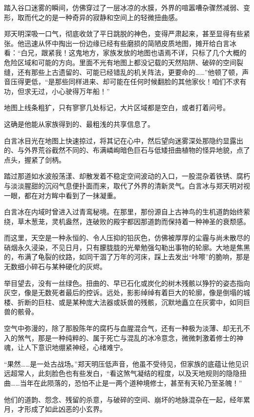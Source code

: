 踏入谷口迷雾的瞬间，仿佛穿过了一层冰凉的水膜，外界的喧嚣嘈杂骤然减弱、变形，取而代之的是一种奇异的寂静和空间上的轻微扭曲感。

郑天明深吸一口气，彻底收敛了平日跳脱的神色，变得严肃起来，甚至显得有些紧张。他迅速从怀中掏出一份边缘已经有些磨损的简陋皮质地图，摊开给白言冰看：“白兄，跟紧我！这鬼地方，家族发放的地图也语焉不详，只标了几个大概的危险区域和可能的方向。里面不光有地图上都没记载的天然陷阱、破碎的空间裂缝，还有那些上古遗留的、可能已经错乱的机关阵法，更要命的……”他顿了顿，声音压得更低，“是那些同样进来、却可能在任何时候翻脸的其他家伙！咱们不求有功，但求无过，小心驶得万年船！”

地图上线条粗犷，只有寥寥几处标记，大片区域都是空白，或者打着问号。

这确是他能从家族得到的、最粗浅的共享信息了。

白言冰目光在地图上快速掠过，将其记在心中，然后望向迷雾深处那隐约显露出的、与外界荒谷截然不同的、布满嶙峋暗色巨石与低矮扭曲植物的怪异地貌，点了点头，握紧了剑柄。

踏过那道如水波般荡漾、却散发着不稳定空间波动的入口，一股混杂着铁锈、腐朽与淡淡腥甜的沉闷气息便扑面而来，取代了外界的清新灵气。白言冰与郑天明对视一眼，都在对方眸中看到了一抹凝重。

白言冰在内域时曾进入过青鸾秘境。在那里，那份源自上古神鸟的生机道韵始终萦绕，草木葱茏，灵机盎然，连破败的殿宇都因那道韵而保持着一种神圣的衰颓感。

而这里，天空是一种永恒的、令人压抑的铅灰色，仿佛被厚厚的尘霾与尚未散尽的硝烟永久浸染，不见日月，只有朦胧胧的光晕勉强勾勒出事物的轮廓。大地是焦黑的，布满了龟裂的纹路，如同干涸了万年的河床，踩上去发出“咔嚓”的脆响，那是无数细小碎石与某种硬化的灰烬。

举目望去，没有一丝绿色。扭曲的、早已石化或炭化的树木残骸以狰狞的姿态指向灰空，像是无数死者最后的控诉。远处，影影绰绰有着巨大的轮廓，像是倒塌的城楼、折断的巨柱、或是某种庞大法器或妖兽的残骸，沉默地矗立在灰雾中，如同巨兽的骸骨。

空气中弥漫的，除了那股陈年的腐朽与血腥混合气，还有一种极为淡薄、却无孔不入的煞气，那是一种纯粹的、属于死亡与混乱的冰冷意念，微微刺激着修士的神魂，让人下意识地绷紧神经，心绪难宁。

“果然……是一处古战场。”郑天明压低声音，他虽不受待见，但家族的底蕴让他见识远超常人，此刻脸色也有些发白，“看这煞气凝结的程度，以及天地规则的隐隐扭曲……当年在此陨落的，恐怕不止是一两个道种境修士，甚至有天轮乃至圣魄！”

他们的道韵、怨念、残留的杀意，与破碎的空间、崩坏的地脉混杂在一起，经年累月，才形成了如此凶恶的小玄界。

